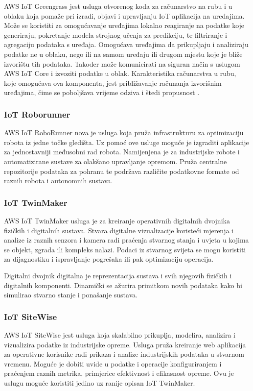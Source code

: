 AWS IoT Greengrass jest usluga otvorenog koda  za računarstvo na rubu  i u oblaku koja pomaže pri izradi, objavi i upravljanju IoT aplikacija na uređajima. Može se koristiti za omogućavanje uređajima lokalno reagiranje na podatke koje generiraju, pokretanje modela strojnog učenja za predikciju, te filtriranje i agregaciju podataka s uređaja. Omogućava uređajima da prikupljaju i analiziraju podatke ne u oblaku, nego ili na samom uređaju ili drugom mjestu koje je bliže izvorištu tih podataka. Također može komunicirati na siguran način s uslugom AWS IoT Core i izvoziti podatke u oblak. Karakteristika računarstva u rubu, koje omogućava ova komponenta, jest približavanje računanja izvorišnim uređajima, čime se poboljšava vrijeme odziva i štedi propusnost \cite{what_is_edge}.

\subsubsection{IoT Roborunner}

AWS IoT RoboRunner nova je usluga koja pruža infrastrukturu za optimizaciju robota iz jedne točke gledišta. Uz pomoć ove usluge moguće je izgraditi aplikacije za jednostavniji međusobni rad robota. Namijenjena je za industrijske robote i automatizirane sustave za olakšano upravljanje opremom. Pruža centralne repozitorije podataka za pohranu te podržava različite podatkovne formate od raznih robota i autonomnih sustava.

\subsubsection{IoT TwinMaker}

AWS IoT TwinMaker usluga je za kreiranje operativnih digitalnih dvojnika fizičkih i digitalnih sustava. Stvara digitalne vizualizacije koristeći mjerenja i analize iz raznih senzora i kamera radi praćenja stvarnog stanja i uvjeta u kojima se objekt, zgrada ili kompleks nalazi. Podaci iz stvarnog svijeta se mogu koristiti za dijagnostiku i ispravljanje pogrešaka ili pak optimizaciju operacija. 

Digitalni dvojnik  digitalna je reprezentacija sustava i svih njegovih fizičkih i digitalnih komponenti. Dinamički se ažurira primitkom novih podataka kako bi simulirao stvarno stanje i ponašanje sustava. 


\subsubsection{IoT SiteWise}

AWS IoT SiteWise jest usluga koja skalabilno prikuplja, modelira, analizira i vizualizira podatke iz industrijske opreme. Usluga pruža kreiranje web aplikacija za operativne korisnike radi prikaza i analize industrijskih podataka u stvarnom vremenu. Moguće je dobiti uvide u podatke i operacije konfiguriranjem i praćenjem raznih metrika, primjerice efektivnost i efikasnost opreme. Ovu je uslugu moguće koristiti jedino uz ranije opisan IoT TwinMaker.

\eject